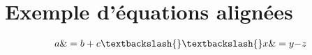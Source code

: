 \documentclass{article}%
\begin{document}
%
\normalsize%
\section{Exemple d'équations alignées}%
\label{sec:Exempledquationsalignes}%

%
\begin{alignat}{2}%
a \&= b + c \textbackslash{}\textbackslash{}%
x \&= y {-} z%
\end{alignat}%
\end{document}
